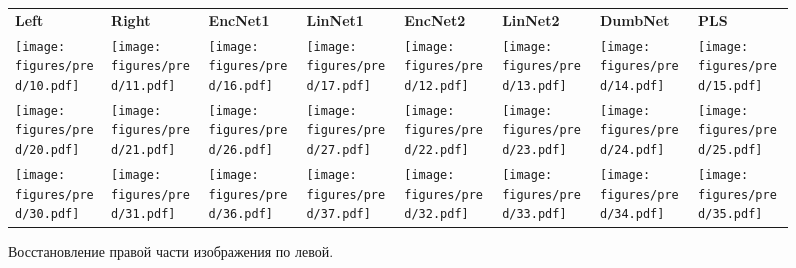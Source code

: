 \documentclass[12pt, twoside]{article}
\begin{document}
\begin{figure}[h!]
\begin{center}
    \begin{tabular}{m{}   m{}   m{}   m{}   m{}  m{}  m{} m{}}
    \hline   
        \textbf{Left} & \textbf{Right} & \textbf{EncNet1} & \textbf{LinNet1} & \textbf{EncNet2} & \textbf{LinNet2} & \textbf{DumbNet} & \textbf{PLS}\\


        \texttt{[image: figures/pred/10.pdf]} & 
        \texttt{[image: figures/pred/11.pdf]} &         \texttt{[image: figures/pred/16.pdf]} & 
        \texttt{[image: figures/pred/17.pdf]} & 
        \texttt{[image: figures/pred/12.pdf]} & 
        \texttt{[image: figures/pred/13.pdf]} & 
        \texttt{[image: figures/pred/14.pdf]} & 
        \texttt{[image: figures/pred/15.pdf]}\\
        
        \texttt{[image: figures/pred/20.pdf]} & 
        \texttt{[image: figures/pred/21.pdf]} &         \texttt{[image: figures/pred/26.pdf]} & 
        \texttt{[image: figures/pred/27.pdf]} & 
        \texttt{[image: figures/pred/22.pdf]} & 
        \texttt{[image: figures/pred/23.pdf]} & 
        \texttt{[image: figures/pred/24.pdf]} & 
        \texttt{[image: figures/pred/25.pdf]}\\
        
        \texttt{[image: figures/pred/30.pdf]} & 
        \texttt{[image: figures/pred/31.pdf]} &         \texttt{[image: figures/pred/36.pdf]} & 
        \texttt{[image: figures/pred/37.pdf]} & 
        \texttt{[image: figures/pred/32.pdf]} & 
        \texttt{[image: figures/pred/33.pdf]} & 
        \texttt{[image: figures/pred/34.pdf]} & 
        \texttt{[image: figures/pred/35.pdf]}\\
    \hline
    
    \end{tabular}
    \end{center}
	\caption{Восстановление правой части изображения по левой.}
	\label{fgr:2}
\end{figure}

\end{document}
